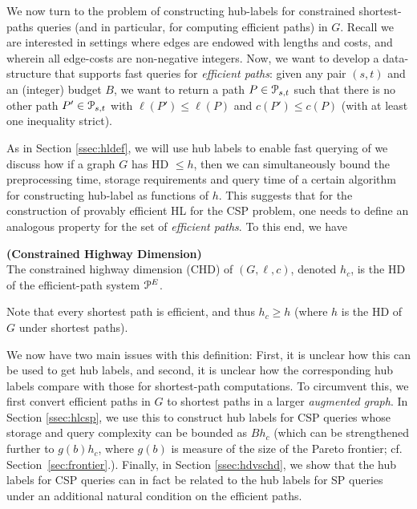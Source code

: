 We now turn to the problem of constructing hub-labels for constrained shortest-paths queries (and in particular, for computing efficient paths) in $G$. 
Recall we are interested in settings where edges are endowed with lengths and costs, and wherein all edge-costs are non-negative integers.
Now, we want to develop a data-structure that supports fast queries for \emph{efficient paths}: given any pair $(s,t)$ and an (integer) budget $B$, we want to return a path $P\in \mathcal{P}_{s,t}$ such that there is no other path $P'\in \mathcal{P}_{s,t}$ with $\ell(P')\leq \ell(P)$ and $c(P')\leq c(P)$ (with at least one inequality strict). 


As in Section \ref{ssec:hldef}, we will use hub labels to enable fast querying of  we discuss how if a graph $G$ has HD $\leq h$, then we can simultaneously bound the preprocessing time, storage requirements and query time of a certain algorithm for constructing hub-label as functions of $h$.
This suggests that for the construction of provably efficient HL for the CSP problem, one needs to define an analogous property for the set of \emph{efficient paths}.
To this end, we have
\begin{definition}
\textbf{(Constrained Highway Dimension)}\\ The constrained highway dimension (CHD) of $(G,\ell,c)$, denoted $h_c$, is the HD of the efficient-path system $\mathcal{P}^E$.
\end{definition}
Note that every shortest path is efficient, and thus $h_c\geq h$ (where $h$ is the HD of $G$ under shortest paths).


We now have two main issues with this definition: First, it is unclear how this can be used to get hub labels, and second, it is unclear how the corresponding hub labels compare with those for shortest-path computations. To circumvent this, we first convert efficient paths in $G$ to shortest paths in a larger \emph{augmented graph}. In Section \ref{ssec:hlcsp}, we use this to construct hub labels for CSP queries whose storage and query complexity can be bounded as $Bh_c$ (which can be strengthened further to $g(b)h_c$, where $g(b)$ is measure of the size of the Pareto frontier; cf. Section~\ref{sec:frontier}.). Finally, in Section \ref{ssec:hdvschd}, we show that the hub labels for CSP queries can in fact be related to the hub labels for SP queries under an additional natural condition on the efficient paths.

